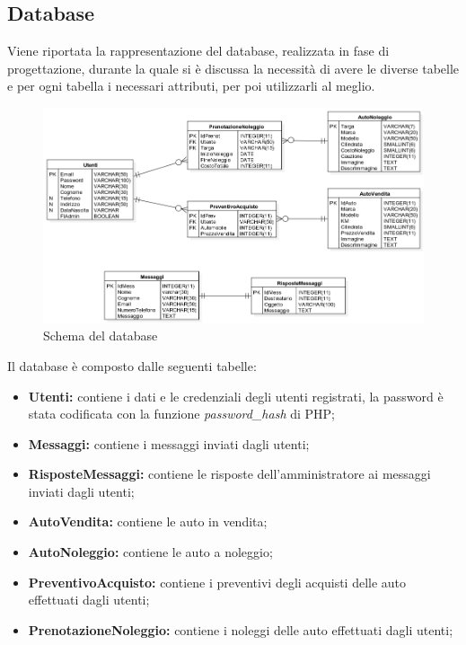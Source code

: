     \subsection{Database}
    Viene riportata la rappresentazione del database, realizzata in fase di progettazione, durante la quale si è discussa la necessità di avere le diverse tabelle e per ogni tabella i necessari attributi, per poi utilizzarli al meglio.
    \begin{figure}[H]
        \centering
        \includegraphics[width=14cm]{./img/database.png}
        \caption{Schema del database}  \label{fig:xray}
    \end{figure}
    Il database è composto dalle seguenti tabelle:
    \begin{itemize}
        \item \textbf{Utenti:} contiene i dati e le credenziali degli utenti registrati, la password è stata codificata con la funzione \textit{password\_hash} di PHP;
        \item \textbf{Messaggi:} contiene i messaggi inviati dagli utenti;
        \item \textbf{RisposteMessaggi:} contiene le risposte dell'amministratore ai messaggi inviati dagli utenti;
        \item \textbf{AutoVendita:} contiene le auto in vendita;
        \item \textbf{AutoNoleggio:} contiene le auto a noleggio;
        \item \textbf{PreventivoAcquisto:} contiene i preventivi degli acquisti delle auto effettuati dagli utenti;
        \item \textbf{PrenotazioneNoleggio:} contiene i noleggi delle auto effettuati dagli utenti;
    \end{itemize}

